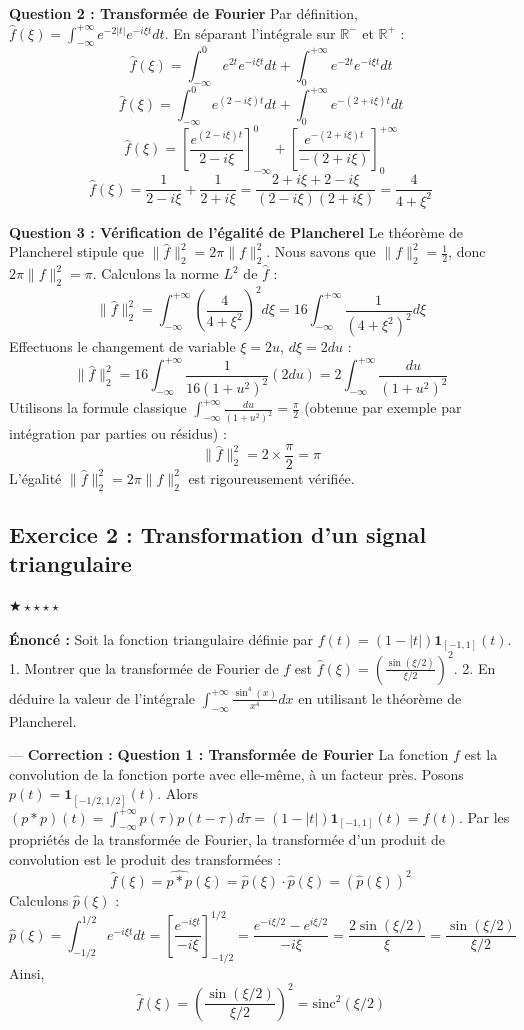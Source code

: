 \documentclass[11pt,a4paper]{article}
\begin{document}
\textbf{Question 2 : Transformée de Fourier}
Par définition, $\hat{f}(\xi) = \int_{-\infty}^{+\infty} e^{-2|t|} e^{-i\xi t} dt$.
En séparant l'intégrale sur $\mathbb{R}^-$ et $\mathbb{R}^+$ :
$$ \hat{f}(\xi) = \int_{-\infty}^{0} e^{2t} e^{-i\xi t} dt + \int_{0}^{+\infty} e^{-2t} e^{-i\xi t} dt $$
$$ \hat{f}(\xi) = \int_{-\infty}^{0} e^{(2-i\xi)t} dt + \int_{0}^{+\infty} e^{-(2+i\xi)t} dt $$
$$ \hat{f}(\xi) = \left[ \frac{e^{(2-i\xi)t}}{2-i\xi} \right]_{-\infty}^0 + \left[ \frac{e^{-(2+i\xi)t}}{-(2+i\xi)} \right]_0^{+\infty} $$
$$ \hat{f}(\xi) = \frac{1}{2-i\xi} + \frac{1}{2+i\xi} = \frac{2+i\xi + 2-i\xi}{(2-i\xi)(2+i\xi)} = \frac{4}{4+\xi^2} $$

\textbf{Question 3 : Vérification de l'égalité de Plancherel}
Le théorème de Plancherel stipule que $\|\hat{f}\|_2^2 = 2\pi \|f\|_2^2$.
Nous savons que $\|f\|_2^2 = \frac{1}{2}$, donc $2\pi \|f\|_2^2 = \pi$.
Calculons la norme $L^2$ de $\hat{f}$ :
$$ \|\hat{f}\|_2^2 = \int_{-\infty}^{+\infty} \left(\frac{4}{4+\xi^2}\right)^2 d\xi = 16 \int_{-\infty}^{+\infty} \frac{1}{(4+\xi^2)^2} d\xi $$
Effectuons le changement de variable $\xi = 2u$, $d\xi = 2du$ :
$$ \|\hat{f}\|_2^2 = 16 \int_{-\infty}^{+\infty} \frac{1}{16(1+u^2)^2} (2du) = 2 \int_{-\infty}^{+\infty} \frac{du}{(1+u^2)^2} $$
Utilisons la formule classique $\int_{-\infty}^{+\infty} \frac{du}{(1+u^2)^2} = \frac{\pi}{2}$ (obtenue par exemple par intégration par parties ou résidus) :
$$ \|\hat{f}\|_2^2 = 2 \times \frac{\pi}{2} = \pi $$
L'égalité $\|\hat{f}\|_2^2 = 2\pi \|f\|_2^2$ est rigoureusement vérifiée.


\subsection*{Exercice 2 : Transformation d'un signal triangulaire}
$\bigstar\star\star\star\star$

\textbf{Énoncé :}
Soit la fonction triangulaire définie par $f(t) = (1-|t|) \mathbf{1}_{[-1, 1]}(t)$.
1. Montrer que la transformée de Fourier de $f$ est $\hat{f}(\xi) = \left(\frac{\sin(\xi/2)}{\xi/2}\right)^2$.
2. En déduire la valeur de l'intégrale $\int_{-\infty}^{+\infty} \frac{\sin^4(x)}{x^4} dx$ en utilisant le théorème de Plancherel.

---
\textbf{Correction :}
\textbf{Question 1 : Transformée de Fourier}
La fonction $f$ est la convolution de la fonction porte avec elle-même, à un facteur près.
Posons $p(t) = \mathbf{1}_{[-1/2, 1/2]}(t)$. Alors $(p * p)(t) = \int_{-\infty}^{+\infty} p(\tau) p(t-\tau) d\tau = (1-|t|) \mathbf{1}_{[-1, 1]}(t) = f(t)$.
Par les propriétés de la transformée de Fourier, la transformée d'un produit de convolution est le produit des transformées :
$$ \hat{f}(\xi) = \widehat{p * p}(\xi) = \hat{p}(\xi) \cdot \hat{p}(\xi) = (\hat{p}(\xi))^2 $$
Calculons $\hat{p}(\xi)$ :
$$ \hat{p}(\xi) = \int_{-1/2}^{1/2} e^{-i\xi t} dt = \left[ \frac{e^{-i\xi t}}{-i\xi} \right]_{-1/2}^{1/2} = \frac{e^{-i\xi/2} - e^{i\xi/2}}{-i\xi} = \frac{2\sin(\xi/2)}{\xi} = \frac{\sin(\xi/2)}{\xi/2} $$
Ainsi,
$$ \hat{f}(\xi) = \left(\frac{\sin(\xi/2)}{\xi/2}\right)^2 = \text{sinc}^2(\xi/2) $$
\end{document}
